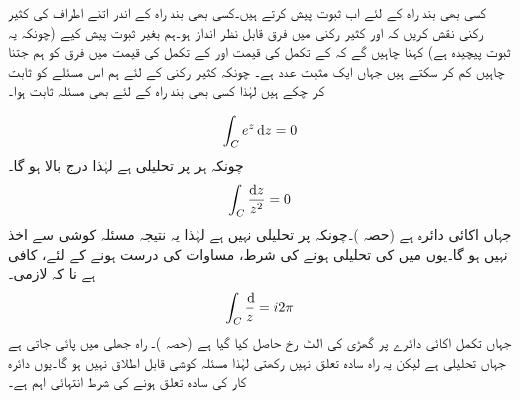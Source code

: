 کسی بھی بند راہ  کے  لئے اب ثبوت پیش کرتے ہیں۔کسی بھی بند راہ کے اندر اتنے اطراف کی کثیر رکنی  نقش کریں کہ  اور کثیر رکنی میں فرق قابل نظر انداز ہو۔ہم بغیر ثبوت پیش کیے (چونکہ یہ ثبوت پیچیدہ ہے) کہنا چاہیں گے کہ   کے تکمل کی قیمت اور  کے تکمل کی قیمت میں فرق   کو ہم جتنا چاہیں کم کر سکتے ہیں جہاں  ایک مثبت عدد ہے۔ چونکہ کثیر رکنی کے لئے ہم اس مسئلے کو ثابت کر چکے ہیں لہٰذا کسی بھی بند راہ کے لئے بھی مسئلہ ثابت ہوا۔ 

\quad
\begin{align*}
\int_C e^z\dif z=0
\end{align*}
چونکہ ہر  پر  تحلیلی ہے لہٰذا درج بالا ہو گا۔
\quad
\begin{align*}
\int_C\frac{\dif z}{z^2}=0
\end{align*}
جہاں  اکائی دائرہ ہے (حصہ )۔چونکہ  پر  تحلیلی نہیں ہے لہٰذا یہ نتیجہ مسئلہ کوشی سے اخذ نہیں ہو گا۔یوں  میں  کی تحلیلی ہونے کی شرط، مساوات  کی درست ہونے کے لئے،  کافی ہے نا کہ لازمی۔
\quad
\begin{align*}
\int_C\frac{\dif }{z}=i2\pi
\end{align*}
جہاں تکمل اکائی دائرے پر گھڑی کی الٹ رخ حاصل کیا گیا ہے (حصہ )۔ راہ  جھلی  میں پائی جاتی ہے جہاں  تحلیلی ہے لیکن یہ راہ سادہ تعلق نہیں رکھتی لہٰذا مسئلہ کوشی قابل اطلاق نہیں ہو گا۔یوں دائرہ کار  کی سادہ تعلق ہونے کی شرط انتہائی اہم ہے۔


